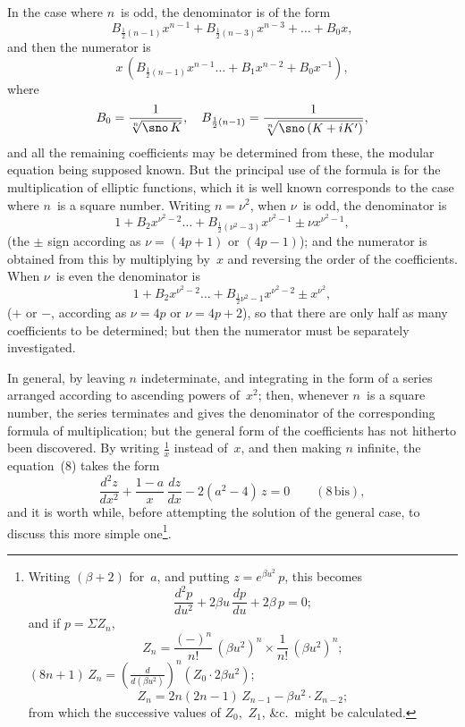 \documentclass[11pt,a4paper]{book}
\begin{document}
In the case where $n$~is odd, the denominator is of the form
\[
B_{\frac{1}{2}(n-1)} x^{n-1} + B_{\frac{1}{2}(n-3)} x^{n-3} + \ldots + B_0 x,
\]
and then the numerator is
\[
x\,(B_{\frac{1}{2}(n-1)} x^{n-1} \ldots + B_1 x^{n-2} + B_0 x^{-1}),
\]
where
\[
B_0 = \frac{1}{\sqrt[n]{\sno\,K}}, \quad B_{\frac{1}{2}(n-1)} = \frac{1}{\sqrt[n]{\sno\,(K+iK')}},
\]
and all the remaining coefficients may be determined from these, the modular equation being supposed known. But the principal use of the formula is for the multiplication of elliptic functions, which it is well known corresponds to the case where $n$~is a square number. Writing $n = \nu^2$, when $\nu$~is odd, the denominator is
\[
1 + B_2 x^{\nu^2-2} \ldots + B_{\frac{1}{2}(\nu^2-3)} x^{\nu^2-1} \pm \nu x^{\nu^2-1},
\]
(the $\pm$ sign according as $\nu = (4p+1)$ or $(4p-1)$); and the numerator is obtained from this by multiplying by~$x$ and reversing the order of the coefficients. When $\nu$~is even the denominator is
\[
1 + B_2 x^{\nu^2-2} \ldots + B_{\frac{1}{2}\nu^2-1} x^{\nu^2-2} \pm x^{\nu^2},
\]
($+$ or $-$, according as $\nu = 4p$ or $\nu = 4p+2$), so that there are only half as many coefficients to be determined; but then the numerator must be separately investigated.

\newpage
In general, by leaving $n$ indeterminate, and integrating in the form of a series arranged according to ascending powers of~$x^2$; then, whenever $n$~is a square number, the series terminates and gives the denominator of the corresponding formula of multiplication; but the general form of the coefficients has not hitherto been discovered. By writing $\frac{1}{x}$ instead of~$x$, and then making $n$ infinite, the equation~(8) takes the form
\[
\frac{d^2z}{dx^2} + \frac{1-a}{x}\,\frac{dz}{dx} - 2(a^2-4)\,z = 0 \qquad(8\,\text{bis}),
\]
and it is worth while, before attempting the solution of the general case, to discuss this more simple one\footnote{Writing $(\beta+2)$ for~$a$, and putting $z = e^{\beta u^2}\,p$, this becomes
\[
\frac{d^2p}{du^2} + 2\beta u\,\frac{dp}{du} + 2\beta\,p = 0;
\]
and if $p = \Sigma Z_n$,
\[
Z_n = \frac{(-)^n}{n!}\,(\beta u^2)^n \times \frac{1}{n!}\,(\beta u^2)^n;
\]
$(8n+1)\,Z_n = \left(\frac{d}{d(\beta u^2)}\right)^n (Z_0 \cdot 2\beta u^2)$;
\[
Z_n = 2n(2n-1)\,Z_{n-1} - \beta u^2 \cdot Z_{n-2};
\]
from which the successive values of $Z_0$,~$Z_1$, \&c.\ might be calculated.}.
\end{document}
